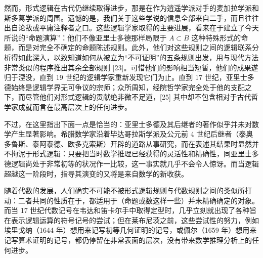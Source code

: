 然而，形式逻辑在古代仍继续取得进步，那是在作为逍遥学派对手的麦加拉学派和斯多葛学派的周围。遗憾的是，我们关于这些学说的信息全部来自二手，而且往往出自论敌或平庸注释者之口。这些逻辑学家取得的主要进展，看来在于建立了今天所说的“命题演算”：他们不像亚里士多德那样局限于 \(A \subset B\) 这种特殊形式的命题，而是对完全不确定的命题陈述规则。此外，他们对这些规则之间的逻辑联系分析得如此深入，以致知道如何从被立为“不可证明”的五条规则出发，用与现代方法非常类似的程序推出其余全部规则 {[}23{]}。可惜他们的影响相当短暂，他们的成果遂归于湮没，直到 19 世纪的逻辑学家重新发现它们为止。直到 17 世纪，亚里士多德始终是逻辑学界无可争议的宗师；众所周知，经院哲学家完全处于他的支配之下，而尽管他们对形式逻辑的贡献绝非微不足道，{[}25{]} 其中却不包含相对于古代哲学家成就而言在最高层次上的任何进步。

不过，在这里指出下面一点是恰当的：亚里士多德及其后继者的著作似乎并未对数学产生显著影响。希腊数学家沿着毕达哥拉斯学派及公元前 4 世纪后继者（泰奥多鲁斯、泰阿泰德、欧多克索斯）开辟的道路从事研究，而在表述其结果时显然并不拘泥于形式逻辑：只要把当时数学推理已经获得的灵活性和精确性，同亚里士多德逻辑尚处于非常初等的状况作一比较，这一事实就几乎不会令人惊讶。而当逻辑超越这一阶段时，指导其演变的又将是来自数学的新收获。

随着代数的发展，人们确实不可能不被形式逻辑规则与代数规则之间的类似所打动：二者共同的性质在于，都适用于（命题或数这样一些）并未精确确定的对象。而当 17 世纪代数记号在韦达和笛卡尔手中取得定型时，几乎立刻就出现了各种旨在表示逻辑运算的符号记号的尝试；但在莱布尼茨之前，这些尝试性的努力，例如埃里戈纳（1644 年）想用来记写初等几何证明的记号，或佩尔（1659 年）想用来记写算术证明的记号，都仍停留在非常表面的层次，没有带来数学推理分析上的任何进步。

